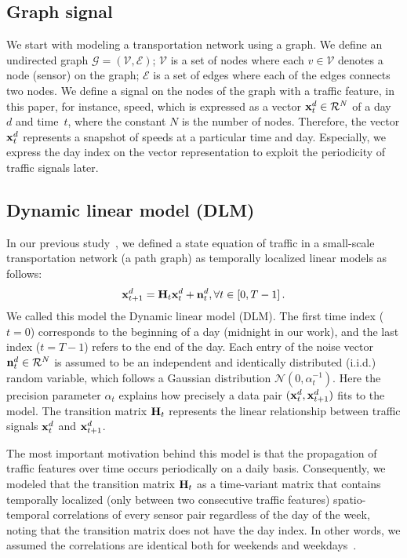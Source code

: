 \documentclass[journal]{IEEEtran}
\begin{document}
\subsection{Graph signal}
We start with modeling a transportation network using a graph. 
We define an undirected graph $\mathcal{G}=(\mathcal{V},\mathcal{E})$; $\mathcal{V}$ is a set of nodes where each $v\in\mathcal{V}$ denotes a node (sensor) on the graph; $\mathcal{E}$ is a set of edges where each of the edges connects two nodes. 
We define a signal on the nodes of the graph with a traffic feature, in this paper, for instance, speed, which is expressed as a vector ${\bf{x}}_t^d\in\mathcal{R}^{N}$ of a day~$d$ and time~$t$, where the constant $N$ is the number of nodes. 
Therefore, the vector ${\bf{x}}_t^d$ represents a snapshot of speeds at a particular time and day. 
Especially, we express the day index on the vector representation to exploit the periodicity of traffic signals later.


\subsection{Dynamic linear model (DLM)}
In our previous study~\cite{kwak2020travel}, we defined a state equation of traffic in a small-scale transportation network (a path graph) as temporally localized linear models as follows:
\begin{equation}\label{eqn:dlm}
    {\bf{x}}_{t+1}^d={\bf{H}}_t{\bf{x}}_t^d+{\bf{n}}_{t}^d,\forall t\in\left[0,T-1\right].
\end{equation}
We called this model the Dynamic linear model (DLM).
The first time index ($t=0$) corresponds to the beginning of a day (midnight in our work), and the last index ($t=T-1$) refers to the end of the day.
Each entry of the noise vector ${\bf{n}}_t^d\in\mathcal{R}^{N}$ is assumed to be an independent and identically distributed (i.i.d.) random variable, which follows a Gaussian distribution $\mathcal{N}(0,\alpha_t^{-1})$. Here the precision parameter $\alpha_t$ explains how precisely a data pair $({\bf{x}}_t^d, {\bf{x}}_{t+1}^d)$ fits to the model. 
The transition matrix ${\bf{H}}_t$ represents the linear relationship between traffic signals ${\bf{x}}_t^d$ and ${\bf{x}}_{t+1}^d$.



The most important motivation behind this model is that the propagation of traffic features over time occurs periodically on a daily basis.
Consequently, we modeled that the transition matrix ${\bf{H}}_t$ as a time-variant matrix that contains temporally localized (only between two consecutive traffic features) spatio-temporal correlations of every sensor pair regardless of the day of the week, noting that the transition matrix does not have the day index. In other words, we assumed the correlations are identical both for weekends and weekdays~\cite{kwak2020travel}.
\end{document}
